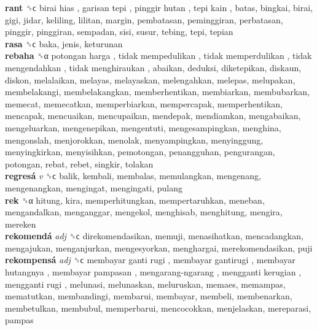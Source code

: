 \textbf{rant} ␝ϲ   birai hias ,  garisan tepi ,  pinggir hutan ,  tepi kain , batas, bingkai, birai, gigi, jidar, keliling, lilitan, margin, pembatasan, peminggiran, perbatasan, pinggir, pinggiran, sempadan, sisi, susur, tebing, tepi, tepian  \\
\textbf{rasa} ␝ϲ  baka, jenis, keturunan  \\
\textbf{rebaha} ␝α   potongan harga ,  tidak mempedulikan ,  tidak memperdulikan ,  tidak mengendahkan ,  tidak menghiraukan , abaikan, deduksi, diketepikan, diskaun, diskon, melalaikan, melayas, melayaskan, melengahkan, melepas, melupakan, membelakangi, membelakangkan, memberhentikan, membiarkan, membubarkan, memecat, memecatkan, memperbiarkan, mempercapak, memperhentikan, mencapak, mencuaikan, mencupaikan, mendepak, mendiamkan, mengabaikan, mengeluarkan, mengenepikan, mengentuti, mengesampingkan, menghina, mengonslah, menjorokkan, menolak, menyampingkan, menyinggung, menyingkirkan, menyisihkan, pemotongan, penangguhan, pengurangan, potongan, rebat, rebet, singkir, tolakan  \\
\textbf{regresá} \emph{v}  ␝ϲ  balik, kembali, membalas, memulangkan, mengenang, mengenangkan, mengingat, mengingati, pulang  \\
\textbf{rek} ␝α  hitung, kira, memperhitungkan, mempertaruhkan, meneban, mengandalkan, menganggar, mengekol, menghisab, menghitung, mengira, mereken  \\
\textbf{rekomendá} \emph{adj}  ␝ϲ  direkomendasikan, memuji, menasihatkan, mencadangkan, mengajukan, menganjurkan, mengesyorkan, menghargai, merekomendasikan, puji  \\
\textbf{rekompensá} \emph{adj}  ␝ϲ   membayar ganti rugi ,  membayar gantirugi ,  membayar hutangnya ,  membayar pampasan ,  mengarang-ngarang ,  mengganti kerugian ,  mengganti rugi , melunasi, melunaskan, meluruskan, memaes, memampas, mematutkan, membandingi, membarui, membayar, membeli, membenarkan, membetulkan, membubul, memperbarui, mencocokkan, menjelaskan, mereparasi, pampas  \\
